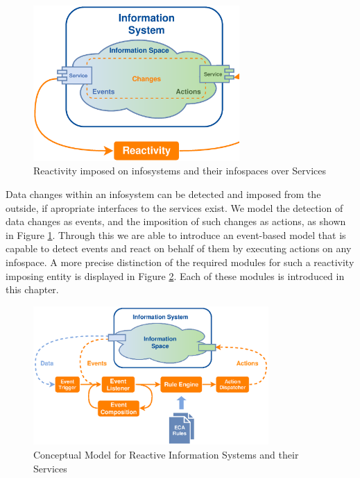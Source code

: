 \begin{figure}[!ht]
  \centering
  \includegraphics[width=0.7\textwidth]{figures/IS_InformationSpace}
  \caption{Reactivity imposed on \textrm{\glspl{infosystem}} and their \textrm{\glspl{infospace}} over Services}
  \label{fig:IS_InformationSpace}
\end{figure}
Data changes within an \textrm{\gls{infosystem}} can be detected and imposed from the outside, if apropriate interfaces to the services exist.
We model the detection of data changes as events, and the imposition of such changes as actions, as shown in Figure \ref{fig:IS_InformationSpace}.
Through this we are able to introduce an event-based model that is capable to detect events and react on behalf of them by executing actions on any \textrm{\gls{infospace}}.
A more precise distinction of the required modules for such a reactivity imposing entity is displayed in Figure \ref{fig:Standard-Model-Template}.
Each of these modules is introduced in this chapter.
\begin{figure}[!ht]
  \centering
  \includegraphics[width=0.8\textwidth]{figures/Standard-Model-Template}
  \caption{Conceptual Model for Reactive Information Systems and their Services}
  \label{fig:Standard-Model-Template}
\end{figure}



